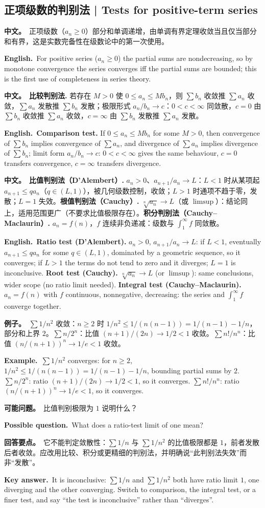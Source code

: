 \documentclass[UTF8,11pt,a4paper]{ctexart}
\newcommand{\BOTH}[2]{\par\noindent\textbf{中文。}\ #1\par\noindent\textbf{English.}\ #2\par}
\newcommand{\EX}[2]{\par\noindent\textbf{例子。}\ #1\par\noindent\textbf{Example.}\ #2\par}
\newcommand{\ASK}[4]{\begin{samepage}\par\noindent\textbf{可能问题。}\ #1\par\noindent\textbf{Possible question.}\ #2\par\noindent\textbf{回答要点。}\ #3\par\noindent\textbf{Key answer.}\ #4\medskip\end{samepage}}
\begin{document}
\subsection{正项级数的判别法 | Tests for positive-term series}
\BOTH{正项级数（$a_n\ge0$）部分和单调递增，由单调有界定理收敛当且仅当部分和有界，这是实数完备性在级数论中的第一次使用。}{For positive series ($a_n\ge0$) the partial sums are nondecreasing, so by monotone convergence the series converges iff the partial sums are bounded; this is the first use of completeness in series theory.}
\BOTH{\textbf{比较判别法.} 若存在 $M>0$ 使 $0\le a_n\le Mb_n$，则 $\sum b_n$ 收敛推 $\sum a_n$ 收敛，$\sum a_n$ 发散推 $\sum b_n$ 发散；极限形式 $a_n/b_n\to c$：$0<c<\infty$ 同敛散，$c=0$ 由 $\sum b_n$ 收敛推 $\sum a_n$ 收敛，$c=\infty$ 由 $\sum b_n$ 发散推 $\sum a_n$ 发散。}{\textbf{Comparison test.} If $0\le a_n\le Mb_n$ for some $M>0$, then convergence of $\sum b_n$ implies convergence of $\sum a_n$, and divergence of $\sum a_n$ implies divergence of $\sum b_n$; limit form $a_n/b_n\to c$: $0<c<\infty$ gives the same behaviour, $c=0$ transfers convergence, $c=\infty$ transfers divergence.}
\BOTH{\textbf{比值判别法（D'Alembert）.} $a_n>0$、$a_{n+1}/a_n\to L$：$L<1$ 时从某项起 $a_{n+1}\le qa_n$（$q\in(L,1)$），被几何级数控制，收敛；$L>1$ 时通项不趋于零，发散；$L=1$ 失效。\textbf{根值判别法（Cauchy）.} $\sqrt[n]{a_n}\to L$（或 $\limsup$）：结论同上，适用范围更广（不要求比值极限存在）。\textbf{积分判别法（Cauchy--Maclaurin）.} $a_n=f(n)$，$f$ 连续非负递减：级数与 $\int_1^\infty f$ 同敛散。}{\textbf{Ratio test (D'Alembert).} $a_n>0$, $a_{n+1}/a_n\to L$: if $L<1$, eventually $a_{n+1}\le qa_n$ for some $q\in(L,1)$, dominated by a geometric sequence, so it converges; if $L>1$ the terms do not tend to zero and it diverges; $L=1$ is inconclusive. \textbf{Root test (Cauchy).} $\sqrt[n]{a_n}\to L$ (or $\limsup$): same conclusions, wider scope (no ratio limit needed). \textbf{Integral test (Cauchy--Maclaurin).} $a_n=f(n)$ with $f$ continuous, nonnegative, decreasing: the series and $\int_1^\infty f$ converge together.}
\EX{$\sum1/n^2$ 收敛：$n\ge2$ 时 $1/n^2\le1/(n(n-1))=1/(n-1)-1/n$，部分和上界 $2$。$\sum n/2^n$：比值 $(n+1)/(2n)\to1/2<1$ 收敛。$\sum n!/n^n$：比值 $(n/(n+1))^n\to1/e<1$ 收敛。}{$\sum1/n^2$ converges: for $n\ge2$, $1/n^2\le1/(n(n-1))=1/(n-1)-1/n$, bounding partial sums by $2$. $\sum n/2^n$: ratio $(n+1)/(2n)\to1/2<1$, so it converges. $\sum n!/n^n$: ratio $(n/(n+1))^n\to1/e<1$, so it converges.}
\ASK{比值判别极限为 $1$ 说明什么？}{What does a ratio-test limit of one mean?}{它不能判定敛散性：$\sum1/n$ 与 $\sum1/n^2$ 的比值极限都是 $1$，前者发散后者收敛。应改用比较、积分或更精细的判别法，并明确说“此判别法失效”而非“发散”。}{It is inconclusive: $\sum1/n$ and $\sum1/n^2$ both have ratio limit $1$, one diverging and the other converging. Switch to comparison, the integral test, or a finer test, and say “the test is inconclusive” rather than “diverges”.}
\end{document}
